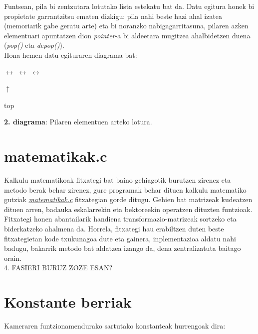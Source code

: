 \documentclass[12pt]{article}
\newcommand{\fitxategi}[1] {\underline{\textit{#1}}}
\newcommand{\metodo}[1] {\textit{#1}}
\begin{document}
Funtsean, pila bi zentzutara lotutako lista estekatu bat da. Datu egitura honek bi propietate garrantzitsu ematen dizkigu: pila nahi beste hazi ahal izatea (memoriarik gabe geratu arte) eta bi noranzko nabigagarritasuna, pilaren azken elementuari apuntatzen dion \textit{pointer}-a bi aldeetara mugitzea ahalbidetzen duena (\metodo{pop()} eta \metodo{depop()}).\\
Hona hemen datu-egituraren diagrama bat:

\begin{center}

 $\leftrightarrow$  $\leftrightarrow$  $\leftrightarrow$ 

\hspace{5.5cm} $\uparrow$

\hspace{5.5cm} top

\textbf{2. diagrama}: Pilaren elementuen arteko lotura.
\end{center}


\section{matematikak.c}\label{matematikak}

Kalkulu matematikoak fitxategi bat baino gehiagotik burutzen zirenez eta metodo berak behar zirenez, gure programak behar dituen kalkulu matematiko gutziak \fitxategi{matematikak.c} fitxategian gorde ditugu. Gehien bat matrizeak kudeatzen dituen arren, badauka eskalarrekin eta bektoreekin operatzen dituzten funtzioak.\\

Fitxategi honen abantailarik handiena transformazio-matrizeak sortzeko eta biderkatzeko ahalmena da. Horrela, fitxategi hau erabiltzen duten beste fitxategietan kode txukunagoa dute eta gainera, inplementazioa aldatu nahi badugu, bakarrik metodo bat aldatzea izango da, dena zentralizatuta baitago orain.\\

4. FASIERI BURUZ ZOZE ESAN?


\section{Konstante berriak}\label{constants}

Kameraren funtzionamendurako sartutako konstanteak hurrengoak dira:
\end{document}
